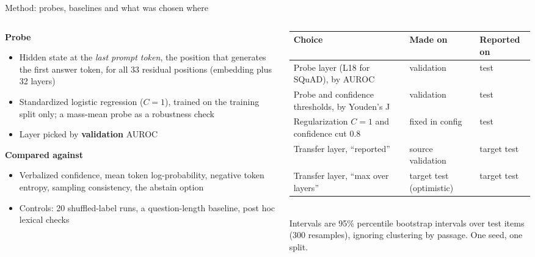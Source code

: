 \documentclass[aspectratio=169,11pt,usepdftitle=false]{beamer}
\begin{document}
\begin{frame}{Method: probes, baselines and what was chosen where}
\scriptsize
\begin{columns}[T]
\begin{column}{0.46\textwidth}
\textbf{Probe}
\begin{itemize}
\item Hidden state at the \emph{last prompt token}, the position that generates the first answer token, for all 33 residual positions (embedding plus 32 layers)
\item Standardized logistic regression ($C=1$), trained on the training split only; a mass-mean probe as a robustness check
\item Layer picked by \textbf{validation} AUROC
\end{itemize}
\textbf{Compared against}
\begin{itemize}
\item Verbalized confidence, mean token log-probability, negative token entropy, sampling consistency, the abstain option
\item Controls: 20 shuffled-label runs, a question-length baseline, post hoc lexical checks
\end{itemize}
\end{column}
\begin{column}{0.50\textwidth}
\scriptsize
\setlength{\tabcolsep}{3pt}
\begin{tabular}{@{}p{3.3cm}p{1.9cm}p{1.2cm}@{}}
\toprule
Choice & Made on & Reported on \\
\midrule
Probe layer (L18 for SQuAD), by AUROC & validation & test \\
Probe and confidence thresholds, by Youden's J & validation & test \\
Regularization $C=1$ and confidence cut 0.8 & fixed in config & test \\
Transfer layer, ``reported'' & source validation & target test \\
Transfer layer, ``max over layers'' & target test (optimistic) & target test \\
\bottomrule
\end{tabular}\\[6pt]
\tiny
Intervals are 95\% percentile bootstrap intervals over test items (300 resamples), ignoring clustering by passage. One seed, one split.
\end{column}
\end{columns}
\end{frame}
\end{document}
